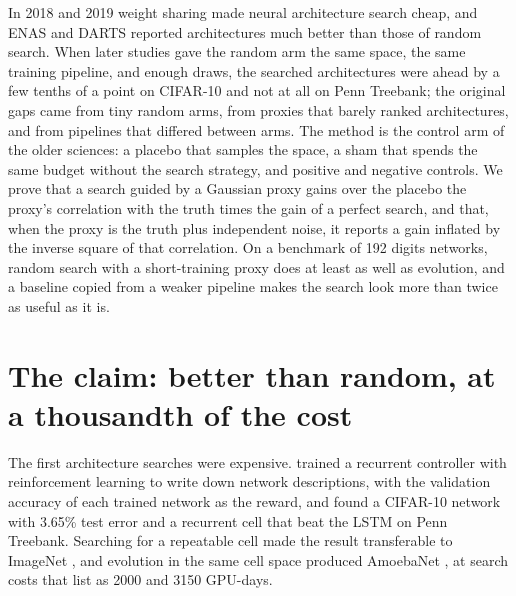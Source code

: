 \begin{refsection}

\begin{chaptersummary}
In 2018 and 2019 weight sharing made neural architecture search cheap, and ENAS and DARTS reported architectures much better than those of random search. When later studies gave the random arm the same space, the same training pipeline, and enough draws, the searched architectures were ahead by a few tenths of a point on CIFAR-10 and not at all on Penn Treebank; the original gaps came from tiny random arms, from proxies that barely ranked architectures, and from pipelines that differed between arms. The method is the control arm of the older sciences: a placebo that samples the space, a sham that spends the same budget without the search strategy, and positive and negative controls. We prove that a search guided by a Gaussian proxy gains over the placebo the proxy's correlation with the truth times the gain of a perfect search, and that, when the proxy is the truth plus independent noise, it reports a gain inflated by the inverse square of that correlation. On a benchmark of 192 digits networks, random search with a short-training proxy does at least as well as evolution, and a baseline copied from a weaker pipeline makes the search look more than twice as useful as it is.
\end{chaptersummary}

\section{The claim: better than random, at a thousandth of the cost}\label{sec:controls:claim}

The first architecture searches were expensive. \Textcite{ZophLe2017} trained a recurrent controller with reinforcement learning to write down network descriptions, with the validation accuracy of each trained network as the reward, and found a CIFAR-10 network with 3.65\% test error and a recurrent cell that beat the LSTM on Penn Treebank. Searching for a repeatable cell made the result transferable to ImageNet \parencite{ZophEtAl2018}, and evolution in the same cell space produced AmoebaNet \parencite{RealEtAl2019}, at search costs that \textcite{LiuSimonyanYang2019} list as 2000 and 3150 GPU-days.


\end{refsection}

